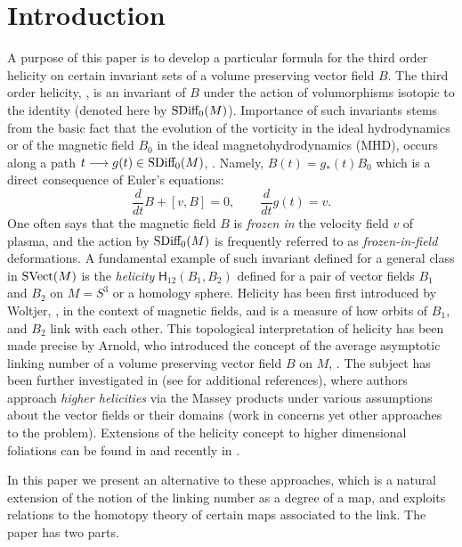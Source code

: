 \documentclass[12pt]{article}
\numberwithin{equation}{section}
\newcommand{\no}{\noindent}
\begin{document}
\section{Introduction}
 A purpose of this paper is to develop a particular formula for the third order helicity on certain  invariant sets of a volume preserving vector field $B$. The third order helicity, \cite{Khesin98}, is an invariant of $B$ under the action of volumorphisms isotopic to the identity (denoted here by $\text{\rm SDiff}_0(M)$).  
\no Importance of such invariants stems from the basic fact that the evolution of the vorticity in the ideal hydrodynamics or of the magnetic field $B_0$ in the ideal magnetohydrodynamics (MHD), occurs along a path $t\longrightarrow g(t)\in \text{\rm SDiff}_0(M)$, \cite[p. 176]{Khesin98}. Namely,
$B(t)=g_\ast(t)B_0$ which is a direct consequence of Euler's equations: 
\begin{equation}\label{eq:Eulers-eq}
\frac{d}{dt} B+[v, B]=0,\qquad \frac{d}{dt} g(t)=v .
\end{equation}
 One often says that the magnetic field $B$ is \emph{frozen in} the velocity field $v$ of plasma, and the action by $\text{\rm SDiff}_0(M)$ is frequently referred to as \emph{frozen-in-field} deformations. A fundamental example of such invariant defined for a general class in $\text{\rm SVect}(M)$ is the \emph{helicity} $\mathsf{H}_{12}(B_1,B_2)$ defined for a pair of vector fields $B_1$ and $B_2$ on $M=S^3$ or a homology sphere. 
Helicity has been first introduced by Woltjer, \cite{Woltjer58}, in the context of magnetic fields, and is a measure of how orbits of $B_1$, and $B_2$ link with each other. This topological interpretation of helicity has been made precise by Arnold, who introduced the concept of the average asymptotic linking number of  a volume preserving vector field $B$ on $M$, \cite{Arnold86}. 
The subject has been further investigated
in \cite{Akhmetiev05, Berger90, Laurence-Stredulinsky00b, Hornig04} (see \cite{Khesin98} for additional references), where authors approach \emph{higher helicities} via the Massey products under various assumptions about the vector fields or their domains (work in \cite{Gambaudo-Ghys97, Spera06, Verjovsky94} concerns yet other approaches to the problem). Extensions of the helicity concept to higher dimensional 
foliations can be found in \cite{Khesin92, Riviere02, Kotschick-Vogel03} and recently in
\cite{Cantarella-Parsley09}.


In this paper we present an alternative to these approaches, which is a natural extension of the notion of the linking number as a degree of a map, and exploits relations to the homotopy theory of certain maps associated to the link. The paper has two parts.
\end{document}
